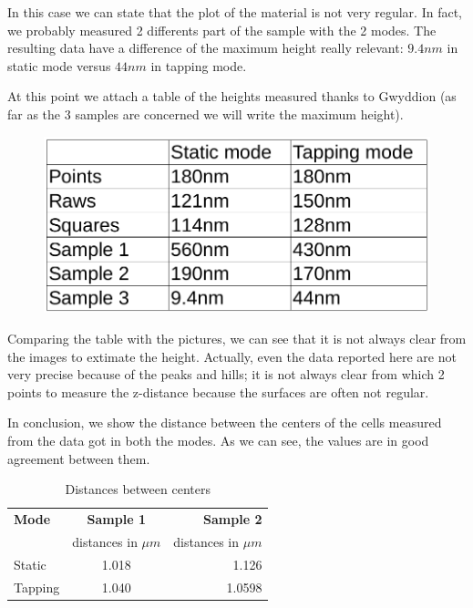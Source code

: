 \documentclass[11pt,a4paper]{article}
\begin{document}
In this case we can state that the plot of the material is not very regular. In fact, we probably measured 2 differents part of the sample with the 2 modes. The resulting data have a difference of the maximum height really relevant: $9.4nm$ in static mode versus $44nm$ in tapping mode.

At this point we attach a table of the heights measured thanks to Gwyddion (as far as the 3 samples are concerned we will write the maximum height).

\begin{figure}[ht]
\begin{center}
\includegraphics[scale=0.4]{table.png}
\end{center}
\end{figure}

Comparing the table with the pictures, we can see that it is not always clear from the images to extimate the height. Actually, even the data reported here are not very precise because of the peaks and hills; it is not always clear from which 2 points to measure the z-distance because the surfaces are often not regular.

In conclusion, we show the distance between the centers of the cells measured from the data got in both the modes. As we can see, the values are in good agreement between them.
\begin{table}[ht]
\begin{center}
    \caption{Distances between centers}
    \label{tab:table2}
    \begin{tabular}{l|c|r} %
      \textbf{Mode} & \textbf{Sample 1} & \textbf{Sample 2}\\
       & distances in $\mu m$ & distances in $\mu m$ \\
      \hline
      Static & 1.018 & 1.126\\
      Tapping & 1.040 & 1.0598\\
      
    \end{tabular}
  \end{center}
\end{table}
\end{document}
